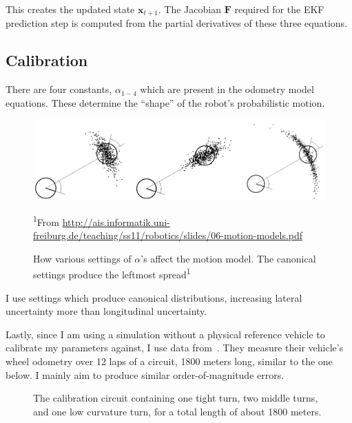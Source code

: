 \documentclass[a4paper,12pt,twoside,openright]{report}
\begin{document}
This creates the updated state $\bm{x}_{t+1}$. The Jacobian $\bm{F}$ required
for the EKF prediction step is computed from the partial derivatives
of these three equations.


\subsection{Calibration}

There are four constants, $\alpha_{1-4}$ which are present in the odometry
model equations. These determine the ``shape'' of the robot's probabilistic
motion.

\begin{figure}
    \includegraphics[width=\linewidth]{figures/implementation/ekf/noise_params.png}
\caption[Noise Parameter Settings]{How various settings of $\alpha$'s affect the motion model. The canonical settings produce the leftmost spread\textsuperscript{1}}
\tiny\textsuperscript{1}{From \url{http://ais.informatik.uni-freiburg.de/teaching/ss11/robotics/slides/06-motion-models.pdf}}
    \label{fig:ekf:noiseparams}
\end{figure}

I use settings which produce canonical distributions, increasing lateral uncertainty more
than longitudinal uncertainty.


Lastly, since I am using a simulation without a physical reference vehicle to
calibrate my parameters against, I use data from~\cite{vivacqua2017low}. 
They measure their vehicle's wheel odometry over 12 laps of a circuit, 1800 meters long, similar
to the one below. I mainly aim to produce similar order-of-magnitude errors.

\begin{figure}
    \begin{center}
        
    \end{center}
    \caption[Calibration Circuit]{The calibration circuit containing one tight turn, two middle turns, and one low curvature turn, for a total length of about 1800 meters.}
    \label{fig:ekf:noiseparams}
\end{figure}
\end{document}
